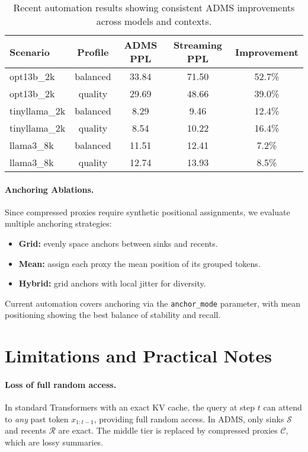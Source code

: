 \documentclass[11pt]{article}
\newcommand{\model}{\textsc{ADMS}} %
\newcommand{\kv}{KV}
\newcommand{\sink}{\mathcal{S}}
\newcommand{\recent}{\mathcal{R}}
\newcommand{\compressed}{\mathcal{C}}
\begin{document}
\begin{table}[h]
\centering
\begin{tabular}{lcccc}
\toprule
\textbf{Scenario} & \textbf{Profile} & \textbf{ADMS PPL} & \textbf{Streaming PPL} & \textbf{Improvement} \\
\midrule
opt13b\_2k & balanced & 33.84 & 71.50 & 52.7\% \\
opt13b\_2k & quality & 29.69 & 48.66 & 39.0\% \\
tinyllama\_2k & balanced & 8.29 & 9.46 & 12.4\% \\
tinyllama\_2k & quality & 8.54 & 10.22 & 16.4\% \\
llama3\_8k & balanced & 11.51 & 12.41 & 7.2\% \\
llama3\_8k & quality & 12.74 & 13.93 & 8.5\% \\
\bottomrule
\end{tabular}
\caption{Recent automation results showing consistent ADMS improvements across models and contexts.}
\end{table}

\paragraph{Anchoring Ablations.}
Since compressed proxies require synthetic positional assignments, we evaluate multiple anchoring strategies:
\begin{itemize}
  \item \textbf{Grid:} evenly space anchors between sinks and recents.
  \item \textbf{Mean:} assign each proxy the mean position of its grouped tokens.
  \item \textbf{Hybrid:} grid anchors with local jitter for diversity.
\end{itemize}
Current automation covers anchoring via the \texttt{anchor\_mode} parameter, with mean positioning showing the best balance of stability and recall.

\section{Limitations and Practical Notes}

\paragraph{Loss of full random access.}
In standard Transformers with an exact \kv{} cache, the query at step $t$ can
attend to \emph{any} past token $x_{1:t-1}$, providing full random access.
In \model{}, only sinks $\sink$ and recents $\recent$ are exact. The middle tier
is replaced by compressed proxies $\compressed$, which are lossy summaries.
\end{document}
